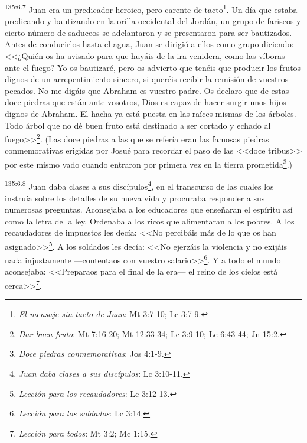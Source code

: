 \par 
\textsuperscript{135:6.7} Juan era un predicador heroico, pero carente de tacto\footnote{\textit{El mensaje sin tacto de Juan}: Mt 3:7-10; Lc 3:7-9.}. Un día que estaba predicando y bautizando en la orilla occidental del Jordán, un grupo de fariseos y cierto número de saduceos se adelantaron y se presentaron para ser bautizados. Antes de conducirlos hasta el agua, Juan se dirigió a ellos como grupo diciendo: <<¿Quién os ha avisado para que huyáis de la ira venidera, como las víboras ante el fuego? Yo os bautizaré, pero os advierto que tenéis que producir los frutos dignos de un arrepentimiento sincero, si queréis recibir la remisión de vuestros pecados. No me digáis que Abraham es vuestro padre. Os declaro que de estas doce piedras que están ante vosotros, Dios es capaz de hacer surgir unos hijos dignos de Abraham. El hacha ya está puesta en las raíces mismas de los árboles. Todo árbol que no dé buen fruto está destinado a ser cortado y echado al fuego>>\footnote{\textit{Dar buen fruto}: Mt 7:16-20; Mt 12:33-34; Lc 3:9-10; Lc 6:43-44; Jn 15:2.}. (Las doce piedras a las que se refería eran las famosas piedras conmemorativas erigidas por Josué para recordar el paso de las <<doce tribus>> por este mismo vado cuando entraron por primera vez en la tierra prometida\footnote{\textit{Doce piedras conmemorativas}: Jos 4:1-9.}.)

\par 
\textsuperscript{135:6.8} Juan daba clases a sus discípulos\footnote{\textit{Juan daba clases a sus discípulos}: Lc 3:10-11.}, en el transcurso de las cuales los instruía sobre los detalles de su nueva vida y procuraba responder a sus numerosas preguntas. Aconsejaba a los educadores que enseñaran el espíritu así como la letra de la ley. Ordenaba a los ricos que alimentaran a los pobres. A los recaudadores de impuestos les decía: <<No percibáis más de lo que os han asignado>>\footnote{\textit{Lección para los recaudadores}: Lc 3:12-13.}. A los soldados les decía: <<No ejerzáis la violencia y no exijáis nada injustamente ---contentaos con vuestro salario>>\footnote{\textit{Lección para los soldados}: Lc 3:14.}. Y a todo el mundo aconsejaba: <<Preparaos para el final de la era--- el reino de los cielos está cerca>>\footnote{\textit{Lección para todos}: Mt 3:2; Mc 1:15.}.

